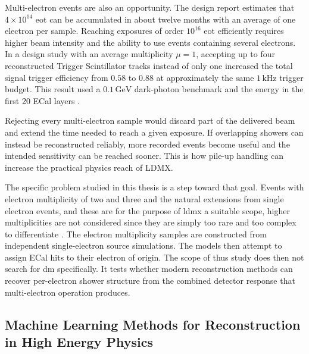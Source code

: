 Multi-electron events are also an opportunity. The design report estimates
that \(4\times10^{14}\) \gls{eot} can be accumulated in about twelve months
with an average of one electron per sample. Reaching exposures of order
\(10^{16}\) \gls{eot} efficiently requires higher beam intensity and the
ability to use events containing several electrons. In a design study with
an average multiplicity \(\mu=1\), accepting up to four reconstructed
Trigger Scintillator tracks instead of only one increased the total signal
trigger efficiency from \(0.58\) to \(0.88\) at approximately the same
\(1\,\mathrm{kHz}\) trigger budget. This result used a
\(0.1\,\mathrm{GeV}\) dark-photon benchmark and the energy in the first 20
ECal layers \cite{ldmx2025-overview}.


Rejecting every multi-electron sample would discard part of the delivered
beam and extend the time needed to reach a given exposure. If overlapping
showers can instead be reconstructed reliably, more recorded events become
useful and the intended sensitivity can be reached sooner. This is how
pile-up handling can increase the practical physics reach of LDMX.

The specific problem studied in this thesis is a step toward that goal. Events with electron multiplicity of
two and three and the natural extensions from single electron events, and these are for the purpose of \gls{ldmx} a suitable scope, higher multiplicities are not considered since they are simply too rare and too complex to differentiate \cite{lene-kristian personal conversation}. The electron multiplicity samples are constructed from independent
single-electron source simulations. The models then attempt to assign ECal
hits to their electron of origin. The scope of thus study does then not search for \gls{dm}
specifically. It tests whether modern reconstruction methods can recover
per-electron shower structure from the combined detector response that
multi-electron operation produces. 



\subsection{Machine Learning Methods for Reconstruction in High Energy Physics}
\label{sec:ml_event_reconstruction_hep}


